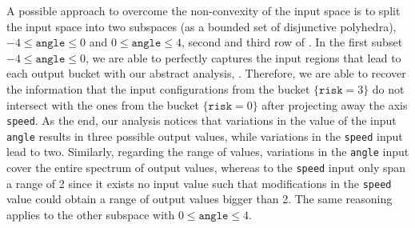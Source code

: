 A possible approach to overcome the non-convexity of the input space is to split the input space into two subspaces (as a bounded set of disjunctive polyhedra), $-4 \le \texttt{angle} \le 0$ and $0 \le \texttt{angle} \le 4$, second and third row of .
In the first subset $-4 \le \texttt{angle} \le 0$, we are able to perfectly captures the input regions that lead to each output bucket with our abstract analysis, \cf{} .
Therefore, we are able to recover the information that the input configurations from the bucket $\{\texttt{risk} =3\}$ do not intersect with the ones from the bucket $\{\texttt{risk} = 0\}$ after projecting away the axis \texttt{speed}.
As the end, our analysis notices that variations in the value of the input \texttt{angle} results in three possible output values, while variations in the \texttt{speed} input lead to two.
Similarly, regarding the range of values, variations in the \texttt{angle} input cover the entire spectrum of output values, whereas to the \texttt{speed} input only span a range of 2 since it exists no input value such that modifications in the \texttt{speed} value could obtain a range of output values bigger than 2.
The same reasoning applies to the other subspace with $0 \le \texttt{angle} \le 4$.

